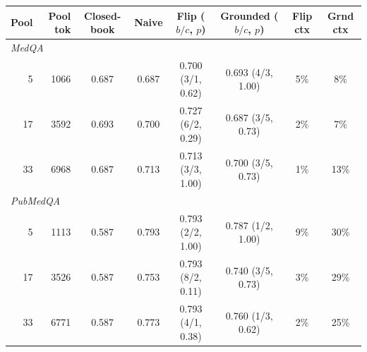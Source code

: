 \begin{tabular}{rrcccccc}
\toprule
Pool & Pool tok & Closed-book & Naive & Flip ($b/c$, $p$) & Grounded ($b/c$, $p$) & Flip ctx & Grnd ctx \\
\midrule
\multicolumn{8}{l}{\textit{MedQA}} \\
5 & 1066 & 0.687 & 0.687 & 0.700 (3/1, 0.62) & 0.693 (4/3, 1.00) & 5\% & 8\% \\
17 & 3592 & 0.693 & 0.700 & 0.727 (6/2, 0.29) & 0.687 (3/5, 0.73) & 2\% & 7\% \\
33 & 6968 & 0.687 & 0.713 & 0.713 (3/3, 1.00) & 0.700 (3/5, 0.73) & 1\% & 13\% \\
\midrule
\multicolumn{8}{l}{\textit{PubMedQA}} \\
5 & 1113 & 0.587 & 0.793 & 0.793 (2/2, 1.00) & 0.787 (1/2, 1.00) & 9\% & 30\% \\
17 & 3526 & 0.587 & 0.753 & 0.793 (8/2, 0.11) & 0.740 (3/5, 0.73) & 3\% & 29\% \\
33 & 6771 & 0.587 & 0.773 & 0.793 (4/1, 0.38) & 0.760 (1/3, 0.62) & 2\% & 25\% \\
\bottomrule
\end{tabular}
